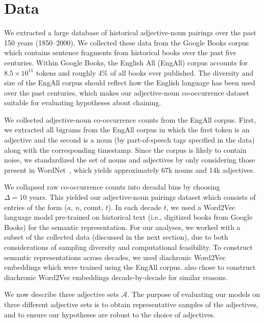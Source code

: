 \documentclass[output=paper]{langsci/langscibook}
\begin{document}
\section{Data}
\label{section:data}

\begin{sloppypar}
We extracted a large database of historical adjective-noun pairings over the past 150 years (1850--2000).
We collected these data from the Google Books corpus~\citep{michel2011quantitative} which contains sentence fragments from historical books over the past five centuries. Within Google Books, the English All ({\sc EngAll}) corpus accounts for $8.5 \times 10^{11}$ tokens and roughly 4\% of all books ever published. The diversity and size of the {\sc EngAll} corpus should reflect how the English language has been used over the past centuries, which makes our adjective-noun co-occurrence dataset suitable for evaluating hypotheses about chaining.
\end{sloppypar}

We collected adjective-noun co-occurrence counts from the {\sc EngAll} corpus. First, we extracted all bigrams from the {\sc EngAll} corpus in which the first token is an adjective and the second is a noun (by part-of-speech tags specified in the data) along with the corresponding timestamp. Since the corpus is likely to contain noise, we standardized the set of nouns and adjectives by only considering those present in WordNet~\citep{miller1995wordnet}, which yields approximately 67k nouns and 14k adjectives.

We collapsed raw co-occurrence counts into decadal bins by choosing $\Delta = 10 \text{ years}$.
This yielded our adjective-noun pairings dataset which consists of entries of the form ($a$, $n$, count, $t$).
In each decade $t$, we used a Word2Vec language model pre-trained on historical text (i.e., digitized books from Google Books) for the semantic representation. For our analyses, we worked with a subset of the collected data (discussed in the next section), due to both considerations of sampling diversity and computational feasibility. To construct semantic representations across decades, we used diachronic Word2Vec embeddings which were trained using the {\sc EngAll} corpus.
\citep{hamilton-etal-2016-diachronic} also chose to construct diachronic Word2Vec embeddings decade-by-decade for similar reasons.

We now describe three adjective sets $\mathcal{A}$.
The purpose of evaluating our models on three different adjective sets is to obtain representative samples of the adjectives, and to ensure our hypotheses are robust to the choice of adjectives.
\end{document}

